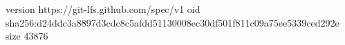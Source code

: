 version https://git-lfs.github.com/spec/v1
oid sha256:d24ddc3a8897d3cdc8c5afdd51130008ec30df501f811c09a75ee5339ced292e
size 43876
